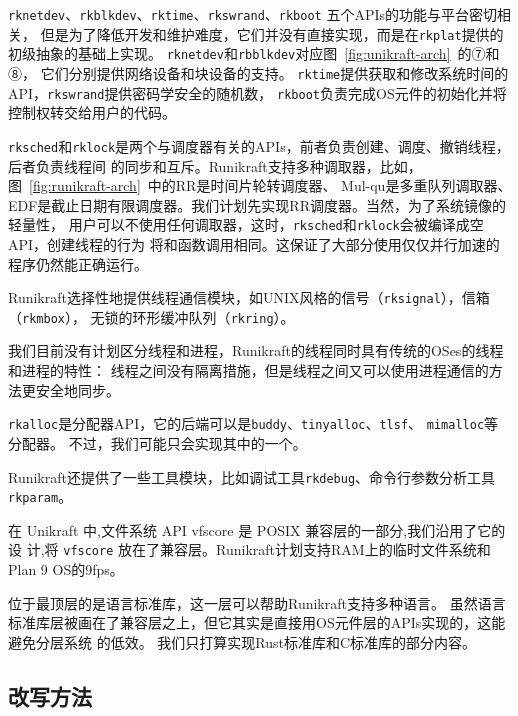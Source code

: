 \documentclass{../runikraft-report}
\begin{document}
\texttt{rknetdev}、\texttt{rkblkdev}、\texttt{rktime}、\texttt{rkswrand}、\texttt{rkboot}
五个APIs的功能与平台密切相关，
但是为了降低开发和维护难度，它们并没有直接实现，而是在\texttt{rkplat}提供的初级抽象的基础上实现。
\texttt{rknetdev}和\texttt{rbblkdev}对应图\ \ref{fig:unikraft-arch}\ 的⑦和⑧，
它们分别提供网络设备和块设备的支持。
\texttt{rktime}提供获取和修改系统时间的API，\texttt{rkswrand}提供密码学安全的随机数，
\texttt{rkboot}负责完成OS元件的初始化并将控制权转交给用户的代码。

\texttt{rksched}和\texttt{rklock}是两个与调度器有关的APIs，前者负责创建、调度、撤销线程，后者负责线程间
的同步和互斥。Runikraft支持多种调取器，比如，图\ \ref{fig:runikraft-arch}\ 中的RR是时间片轮转调度器、
Mul-qu是多重队列调取器、EDF是截止日期有限调度器。我们计划先实现RR调度器。当然，为了系统镜像的轻量性，
用户可以不使用任何调取器，这时，\texttt{rksched}和\texttt{rklock}会被编译成空API，创建线程的行为
将和函数调用相同。这保证了大部分使用仅仅并行加速的程序仍然能正确运行。

Runikraft选择性地提供线程通信模块，如UNIX风格的信号（\texttt{rksignal}），信箱（\texttt{rkmbox}），
无锁的环形缓冲队列（\texttt{rkring}）。

我们目前没有计划区分线程和进程，Runikraft的线程同时具有传统的OSes的线程和进程的特性：
线程之间没有隔离措施，但是线程之间又可以使用进程通信的方法更安全地同步。

\texttt{rkalloc}是分配器API，它的后端可以是\texttt{buddy}、\texttt{tinyalloc}、\texttt{tlsf}、
\texttt{mimalloc}等分配器。
不过，我们可能只会实现其中的一个。

Runikraft还提供了一些工具模块，比如调试工具\texttt{rkdebug}、命令行参数分析工具\texttt{rkparam}。

在 Unikraft 中,文件系统 API vfscore 是 POSIX 兼容层的一部分,我们沿用了它的设
计,将 \texttt{vfscore} 放在了兼容层。Runikraft计划支持RAM上的临时文件系统和Plan 9 OS的9fps。

位于最顶层的是语言标准库，这一层可以帮助Runikraft支持多种语言。
虽然语言标准库层被画在了兼容层之上，但它其实是直接用OS元件层的APIs实现的，这能避免分层系统
的低效。
我们只打算实现Rust标准库和C标准库的部分内容。

\subsection{改写方法}
\end{document}
